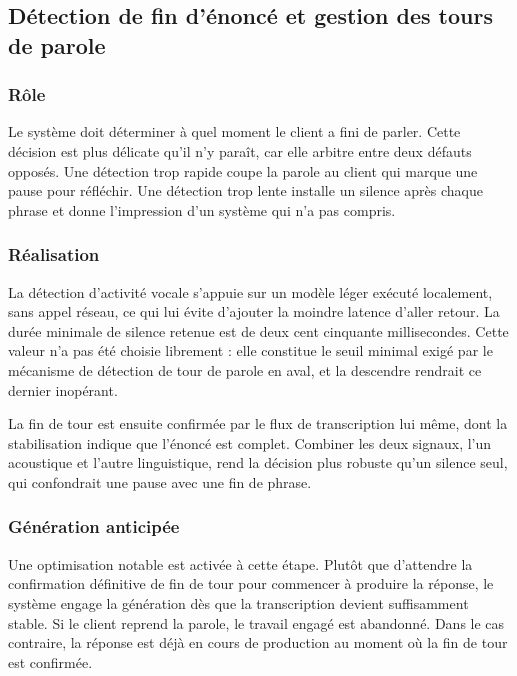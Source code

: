 \subsection{Détection de fin d'énoncé et gestion des tours de parole}

\subsubsection{Rôle}

Le système doit déterminer à quel moment le client a fini de parler. Cette décision est plus délicate qu'il n'y paraît, car elle arbitre entre deux défauts opposés. Une détection trop rapide coupe la parole au client qui marque une pause pour réfléchir. Une détection trop lente installe un silence après chaque phrase et donne l'impression d'un système qui n'a pas compris.

\subsubsection{Réalisation}

La détection d'activité vocale s'appuie sur un modèle léger exécuté localement, sans appel réseau, ce qui lui évite d'ajouter la moindre latence d'aller retour. La durée minimale de silence retenue est de deux cent cinquante millisecondes. Cette valeur n'a pas été choisie librement : elle constitue le seuil minimal exigé par le mécanisme de détection de tour de parole en aval, et la descendre rendrait ce dernier inopérant.

La fin de tour est ensuite confirmée par le flux de transcription lui même, dont la stabilisation indique que l'énoncé est complet. Combiner les deux signaux, l'un acoustique et l'autre linguistique, rend la décision plus robuste qu'un silence seul, qui confondrait une pause avec une fin de phrase.

\subsubsection{Génération anticipée}

Une optimisation notable est activée à cette étape. Plutôt que d'attendre la confirmation définitive de fin de tour pour commencer à produire la réponse, le système engage la génération dès que la transcription devient suffisamment stable. Si le client reprend la parole, le travail engagé est abandonné. Dans le cas contraire, la réponse est déjà en cours de production au moment où la fin de tour est confirmée.

